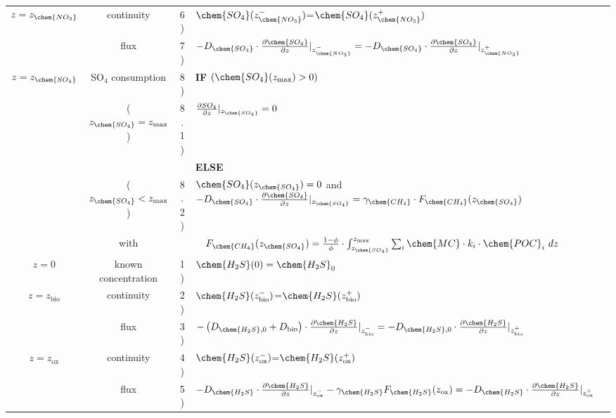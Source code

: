 \documentclass[gmd, manuscript]{copernicus}
\begin{document}
\begin{table}[tbp]
\begin{tabular}{ |c| c| c l|}
$z=z_{\chem{NO_3}}$&continuity& 6)& $\chem{SO_4}(z_{\chem{NO_3}}^-)$=$\chem{SO_4}(z_{\chem{NO_3}}^+)$\\
               & flux & 7)& $-D_{\chem{SO_4}}\cdot \frac{\partial \chem{SO_4}}{\partial z}|_{z_{\chem{NO_3}}^-}=-D_{\chem{SO_4}} \cdot \frac{\partial \chem{SO_4}}{\partial z}|_{z_{\chem{NO_3}}^+}$\\
$z=z_{\chem{SO_4}}$& SO$_4$ consumption & 8)&  \textbf{IF} $ (\chem{SO_4}(z_\mathrm{max})> 0 )$\\
& ($z_{\chem{SO_4}} = z_\mathrm{max}$) & 8.1) & \quad $\frac{\partial SO_4}{\partial z}|_{z_{\chem{SO_4}}}=0$\\
& & &\textbf{ELSE} \\
& ($z_{\chem{SO_4}} < z_\mathrm{max}$) & 8.2) & \quad $\chem{SO_4}(z_{\chem{SO_4}})=0$ \quad and \quad $-D_{\chem{SO_4}} \cdot \frac{\partial \chem{SO_4}}{\partial z}|_{z_{\chem{SO_4}}}= \gamma_\chem{CH_4} \cdot F_{\chem{CH_4}}(z_{\chem{SO_4}})$\\%
& with & &$ \quad F_{\chem{CH_4}}(z_{\chem{SO_4}})=\frac{1-\phi}{\phi} \cdot \int_{z_{\chem{SO_4}}}^{z_\mathrm{max}}  \sum_i \chem{MC} \cdot k_i \cdot \chem{POC}_i\ dz$ \\
\hline
$z=0$& known concentration& 1)& $\chem{H_2S}(0)=\chem{H_2S}_{0}$  \\
$z=z_{\mathrm{bio}}$&continuity& 2)& $\chem{H_2S}(z_{\mathrm{bio}}^-)$=$\chem{H_2S}(z_{\mathrm{bio}}^+)$\\
               & flux & 3)& $-\left(D_{\chem{H_2S},0}+D_{\mathrm{bio}}\right )\cdot \frac{\partial \chem{H_2S}}{\partial z}|_{z_{\mathrm{bio}}^-}=-D_{\chem{H_2S},0} \cdot \frac{\partial \chem{H_2S}}{\partial z}|_{z_{\mathrm{bio}}^+}$\\
$z=z_{\mathrm{ox}}$& continuity& 4)& $\chem{H_2S}(z_{\mathrm{ox}}^-)$=$\chem{H_2S}(z_{\mathrm{ox}}^+)$\\
               & flux & 5)& $-D_{\chem{H_2S}} \cdot \frac{\partial \chem{H_2S}}{\partial z}|_{z_{\mathrm{ox}}^-} - \gamma_\chem{H_2S}  F_{\chem{H_2S}}(z_{\mathrm{ox}})=-D_{\chem{H_2S}} \cdot \frac{\partial \chem{H_2S}}{\partial z}|_{z_{\mathrm{ox}}^+}$\\

\end{tabular}
\end{table}
\end{document}
